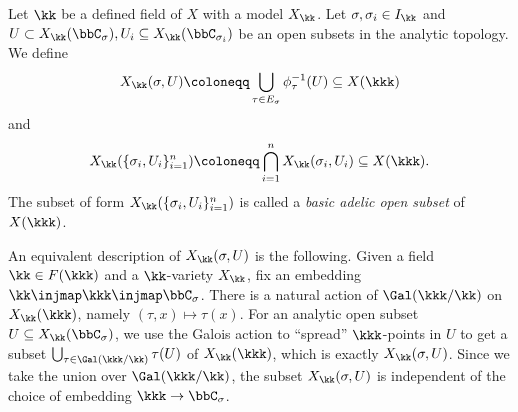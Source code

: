     \begin{definition}\label{def:basic_adelic_subset}
        Let \(\kk\) be a defined field of \(X\) with a model \(X_\kk\).
        Let \(\sigma,\sigma_i \in I_\kk\) and \(U \subset X_{\kk}(\bbC_\sigma), U_i \subseteq X_{\kk}(\bbC_{\sigma_i})\) be an open subsets in the analytic topology.
        We define
        \[ X_\kk(\sigma,U) \coloneqq \bigcup_{\tau\in E_\sigma} \phi_\tau^{-1}(U) \subseteq X(\kkk) \]
        and 
        \[ X_\kk(\{\sigma_i,U_i\}_{i=1}^n) \coloneqq \bigcap_{i=1}^n X_\kk(\sigma_i,U_i) \subseteq X(\kkk). \]
        The subset of form \(X_\kk(\{\sigma_i,U_i\}_{i=1}^n)\) is called a \emph{basic adelic open subset} of \(X(\kkk)\).
    \end{definition}

    An equivalent description of \(X_\kk(\sigma,U)\) is the following. 
    Given a field \(\kk \in F(\kkk)\) and a \(\kk\)-variety \(X_\kk\), fix an embedding \(\kk \injmap \kkk \injmap \bbC_\sigma\).
    There is a natural action of \(\Gal(\kkk/\kk)\) on \(X_\kk(\kkk)\), namely \((\tau,x) \mapsto \tau(x)\).
    For an analytic open subset \(U \subseteq X_{\kk}(\bbC_\sigma)\), we use the Galois action to ``spread'' \(\kkk\)-points in \(U\) to get a subset \(\bigcup_{\tau \in \Gal(\kkk/\kk)} \tau(U)\) of \(X_\kk(\kkk)\), which is exactly \(X_\kk(\sigma,U)\).
    Since we take the union over \(\Gal(\kkk/\kk)\), the subset \(X_\kk(\sigma,U)\) is independent of the choice of embedding \(\kkk \to \bbC_\sigma\).

